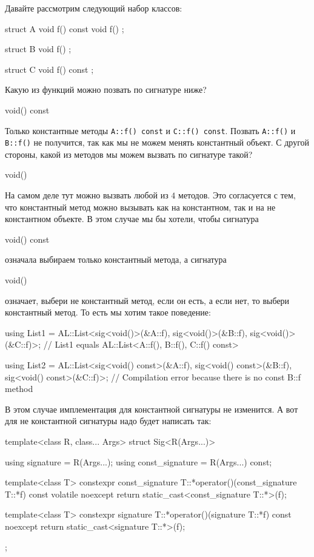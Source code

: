 Давайте рассмотрим следующий набор классов:
\begin{cppcode}
struct A {
  void f() const {}
  void f() {}
};

struct B {
  void f() {}
};

struct C {
  void f() const {}
};
\end{cppcode}
Какую из функций можно позвать по сигнатуре ниже?
\begin{cppcode}[numbers = none]
void() const
\end{cppcode}
Только константные методы \verb"A::f() const" и \verb"C::f() const".
Позвать \verb"A::f()" и \verb"B::f()" не получится, так как мы не можем менять константный объект.
С другой стороны, какой из методов мы можем вызвать по сигнатуре такой?
\begin{cppcode}[numbers = none]
void()
\end{cppcode}
На самом деле тут можно вызвать любой из $4$ методов.
Это согласуется с тем, что константный метод можно вызывать как на константном, так и на не константном объекте.
В этом случае мы бы хотели, чтобы сигнатура
\begin{cppcode}[numbers = none]
void() const
\end{cppcode}
означала выбираем только константный метода, а сигнатура
\begin{cppcode}[numbers = none]
void()
\end{cppcode}
означает, выбери не константный метод, если он есть, а если нет, то выбери константный метод.
То есть мы хотим такое поведение:
\begin{cppcode}
using List1 = AL::List<sig<void()>(&A::f), sig<void()>(&B::f), sig<void()>(&C::f)>;
// List1 equals AL::List<A::f(), B::f(), C::f() const>

using List2 =
    AL::List<sig<void() const>(&A::f), sig<void() const>(&B::f), sig<void() const>(&C::f)>;
// Compilation error because there is no const B::f method
\end{cppcode}
В этом случае имплементация для константной сигнатуры не изменится.
А вот для не константной сигнатуры надо будет написать так:
\begin{cppcode}

template<class R, class... Args>
struct Sig<R(Args...)> {
  using signature = R(Args...);
  using const_signature = R(Args...) const;

  template<class T>
  constexpr const_signature T::*operator()(const_signature T::*f) const volatile noexcept {
    return static_cast<const_signature T::*>(f);
  }

  template<class T>
  constexpr signature T::*operator()(signature T::*f) const noexcept {
    return static_cast<signature T::*>(f);
  }
};
\end{cppcode}
